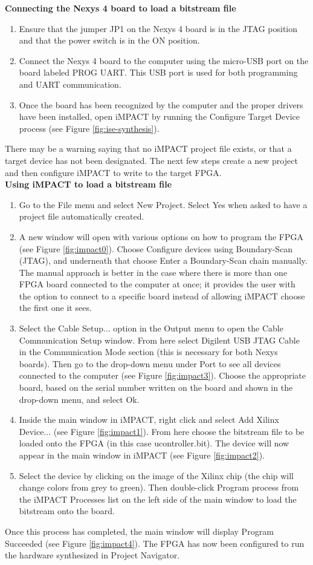 \textbf{Connecting the Nexys 4 board to load a bitstream file}
\begin{enumerate}
	\item Ensure that the jumper JP1 on the Nexys 4 board is in the JTAG position and that the power switch is in the ON position.
	\item Connect the Nexys 4 board to the computer using the micro-USB port on the board labeled PROG UART. This USB port is used for both programming and UART communication.
	\item Once the board has been recognized by the computer and the proper drivers have been installed, open iMPACT by running the Configure Target Device process (see Figure \ref{fig:ise-synthesis}).
\end{enumerate}

There may be a warning saying that no iMPACT project file exists, or that a target device has not been designated. The next few steps create a new project and then configure iMPACT to write to the target FPGA.\\ %

\textbf{Using iMPACT to load a bitstream file}
\begin{enumerate}
	\item Go to the File menu and select New Project. Select Yes when asked to have a project file automatically created.
	\item A new window will open with various options on how to program the FPGA (see Figure \ref{fig:impact0}). Choose Configure devices using Boundary-Scan (JTAG), and underneath that choose Enter a Boundary-Scan chain manually. The manual approach is better in the case where there is more than one FPGA board connected to the computer at once; it provides the user with the option to connect to a specific board instead of allowing iMPACT choose the first one it sees.
	\item Select the Cable Setup... option in the Output menu to open the Cable Communication Setup window. From here select Digilent USB JTAG Cable in the Communication Mode section (this is necessary for both Nexys boards). Then go to the drop-down menu under Port to see all devices connected to the computer (see Figure \ref{fig:impact3}). Choose the appropriate board, based on the serial number written on the board and shown in the drop-down menu, and select Ok.
	\item Inside the main window in iMPACT, right click and select Add Xilinx Device... (see Figure \ref{fig:impact1}). From here choose the bitstream file to be loaded onto the FPGA (in this case ucontroller.bit). The device will now appear in the main window in iMPACT (see Figure \ref{fig:impact2}).
	\item Select the device by clicking on the image of the Xilinx chip (the chip will change colors from grey to green). Then double-click Program process from the iMPACT Processes list on the left side of the main window to load the bitstream onto the board.
\end{enumerate}
Once this process has completed, the main window will display Program Succeeded (see Figure \ref{fig:impact4}). The FPGA has now been configured to run the hardware synthesized in Project Navigator.

